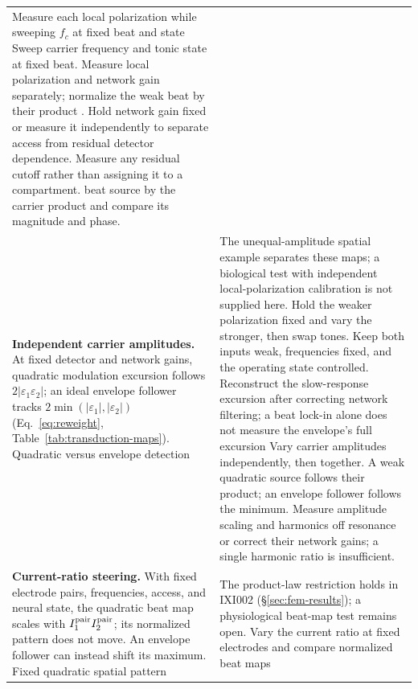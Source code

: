 \documentclass[11pt,a4paper]{article}
\providecommand{\DIFaddtex}[1]{{\protect\color{blue} \sf #1}} %
\providecommand{\DIFdeltex}[1]{{\protect\color{red} \scriptsize #1}} %
\providecommand{\DIFaddFL}[1]{\DIFadd{#1}} %
\providecommand{\DIFdelFL}[1]{\DIFdel{#1}} %
\providecommand{\DIFaddbeginFL}{} %
\providecommand{\DIFaddendFL}{} %
\providecommand{\DIFdelbeginFL}{} %
\providecommand{\DIFdelendFL}{} %
\providecommand{\DIFadd}[1]{\texorpdfstring{\DIFaddtex{#1}}{#1}} %
\providecommand{\DIFdel}[1]{\texorpdfstring{\DIFdeltex{#1}}{}} %
\begin{document}
\begin{table}[htbp]
\begin{tabular}{@{}>{\raggedright\arraybackslash}p{}
 >{\raggedright\arraybackslash}p{}@{}}
{Local polarizations were not held fixed
.
}%
\DIFdelFL{Measure each local polarization while sweeping $f_c$ at fixed beat and state}\DIFdelendFL \DIFaddbeginFL \DIFaddFL{Sweep carrier frequency and tonic state at fixed
beat. Measure local polarization and network gain separately}\DIFaddendFL ; normalize the
\DIFdelbeginFL \DIFdelFL{weak beat by their product . Hold network gain fixed or measure it
independently to separate access from residual detector dependence. Measure any
residual cutoff rather than assigning it to a compartment. }\DIFdelendFL \DIFaddbeginFL \DIFaddFL{beat source by the carrier product and compare its magnitude and phase. }\DIFaddendFL \\[4pt]
\DIFdelbeginFL \DIFdelFL{\textbf{Independent carrier amplitudes.} At fixed detector and network gains,
quadratic modulation excursion follows $2|\varepsilon_1\varepsilon_2|$; an ideal envelope
follower tracks $2\min(|\varepsilon_1|,|\varepsilon_2|)$
(Eq.~\eqref{eq:reweight}, Table~\ref{tab:transduction-maps}).
}\DIFdelendFL \DIFaddbeginFL \DIFaddFL{Quadratic versus envelope detection }\DIFaddendFL & \DIFdelbeginFL \DIFdelFL{The unequal-amplitude spatial example separates these maps; a biological test
with independent local-polarization calibration is not supplied here.
}%
\DIFdelFL{Hold the weaker polarization fixed and vary the stronger, then swap tones. Keep both inputs weak, frequencies fixed, and the operating state controlled.
Reconstruct the slow-response excursion after correcting network filtering; a beat lock-in alone does not measure the envelope's full excursion}\DIFdelendFL \DIFaddbeginFL \DIFaddFL{Vary carrier amplitudes independently,
then together. A weak quadratic source follows their product; an envelope
follower follows the minimum. Measure amplitude scaling and harmonics off
resonance or correct their network gains; a single harmonic ratio is insufficient}\DIFaddendFL . \\[4pt]
\DIFdelbeginFL \DIFdelFL{\textbf{Current-ratio steering.} With fixed electrode pairs, frequencies,
access, and neural state, the quadratic beat map scales with
$I_1^{\rm pair}I_2^{\rm pair}$; its normalized pattern does not move.
An envelope follower can instead shift its maximum.
}\DIFdelendFL \DIFaddbeginFL \DIFaddFL{Fixed quadratic spatial pattern }\DIFaddendFL & \DIFdelbeginFL \DIFdelFL{The product-law restriction \cite{cassara2025part2} holds in IXI002
(\S\ref{sec:fem-results}); a physiological beat-map test remains open.
}%
\DIFdelendFL Vary the current ratio at fixed electrodes\DIFdelbeginFL \DIFdelFL{and compare normalized beat maps
}
\end{tabular}
\end{table}
\end{document}
